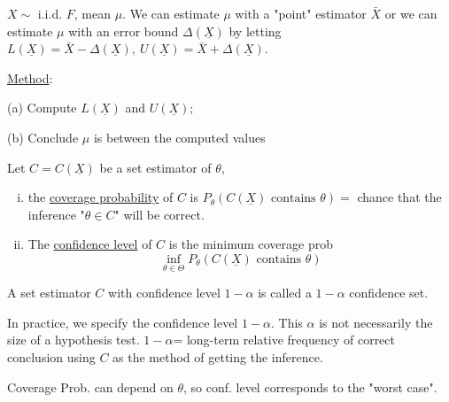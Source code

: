 \documentclass[english, 11pt]{article}
\begin{document}
\begin{exmp}\label{exmp:62}
$X\sim\text{ i.i.d. }F$, mean $\mu$. We can estimate $\mu$ with a "point" estimator $\bar{X}$ or we can estimate $\mu$ with an error bound $\Delta(\underline{X})$ by letting $L(\underline{X})=\bar{X}-\Delta(\underline{X}), ~U(\underline{X})=\bar{X}+\Delta(\underline{X})$.

\underline{Method}: 

(a) Compute $L(\underline{X})$ and $U(\underline{X})$;

(b) Conclude $\mu$ is between the computed values
\end{exmp}

\begin{defn}\label{defn:63}
Let $C=C(\underline{X})$ be a set estimator of $\theta$, 
\begin{enumerate}[i)]
\item the \underline{coverage probability} of $C$ is $P_{\theta}(C(\underline{X})\text{ contains }\theta)=$ chance that the inference "$\theta\in C$" will be correct.
\item The \underline{confidence level} of $C$ is the minimum coverage prob
$$
\inf_{\theta\in\Theta}P_{\theta}(C(\underline{X})\text{ contains }\theta)
$$
\end{enumerate}
\end{defn}

A set estimator $C$ with confidence level $1-\alpha$ is called  a $1-\alpha$ confidence set.

In practice, we specify the confidence level $1-\alpha$. This $\alpha$ is not necessarily the size of a hypothesis test. $1-\alpha$= long-term relative frequency of correct conclusion using $C$ as the method of getting the inference.

Coverage Prob. can depend on $\theta$, so conf. level corresponds to the "worst case".
\end{document}
